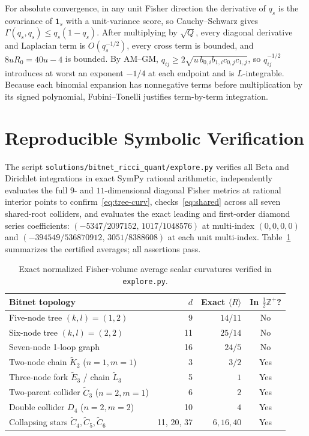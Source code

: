 \documentclass[11pt]{article}
\theoremstyle{plain}
\theoremstyle{definition}
\theoremstyle{remark}
\begin{document}
For absolute convergence, in any unit Fisher direction the derivative of $q_s$ is the covariance of $\mathbf{1}_s$ with a unit-variance score, so Cauchy--Schwarz gives $\Gamma(q_s, q_s) \le q_s(1 - q_s)$. After multiplying by $\sqrt{Q}$, every diagonal derivative and Laplacian term is $O(q_s^{-1/2})$, every cross term is bounded, and $8uR_0 = 40u - 4$ is bounded. By AM--GM, $q_{ij} \ge 2\sqrt{u\,b_{0,i} b_{1,i} c_{0,j} c_{1,j}}$, so $q_{ij}^{-1/2}$ introduces at worst an exponent $-1/4$ at each endpoint and is $L$-integrable. Because each binomial expansion has nonnegative terms before multiplication by its signed polynomial, Fubini--Tonelli justifies term-by-term integration.

\section{Reproducible Symbolic Verification}

The script \texttt{solutions/bitnet\_ricci\_quant/explore.py} verifies all Beta and Dirichlet integrations in exact SymPy rational arithmetic, independently evaluates the full $9$- and $11$-dimensional diagonal Fisher metrics at rational interior points to confirm~\eqref{eq:tree-curv}, checks~\eqref{eq:shared} across all seven shared-root colliders, and evaluates the exact leading and first-order diamond series coefficients: $(-5347/2097152,\, 1017/1048576)$ at multi-index $(0,0,0,0)$ and $(-394549/536870912,\, 3051/8388608)$ at each unit multi-index. Table~\ref{tab:bitnets} summarizes the certified averages; all assertions pass.

\begin{table}[htbp]
\centering
\begin{tabular}{@{}lrrc@{}}
\toprule
Bitnet topology & $d$ & Exact $\langle R \rangle$ & In $\tfrac{1}{2}\mathbb{Z}^+$? \\
\midrule
Five-node tree $(k, l) = (1, 2)$ & 9 & $14/11$ & No \\
Six-node tree $(k, l) = (2, 2)$ & 11 & $25/14$ & No \\
Seven-node 1-loop graph & 16 & $24/5$ & No \\
Two-node chain $\tilde{K}_2$ ($n=1, m=1$) & 3 & $3/2$ & Yes \\
Three-node fork $\tilde{E}_3$ / chain $\tilde{L}_3$ & 5 & $1$ & Yes \\
Two-parent collider $\tilde{C}_3$ ($n=2, m=1$) & 6 & $2$ & Yes \\
Double collider $D_4$ ($n=2, m=2$) & 10 & $4$ & Yes \\
Collapsing stars $\tilde{C}_4, \tilde{C}_5, \tilde{C}_6$ & 11, 20, 37 & $6, 16, 40$ & Yes \\
\bottomrule
\end{tabular}
\caption{Exact normalized Fisher-volume average scalar curvatures verified in \texttt{explore.py}.}\label{tab:bitnets}
\end{table}
\end{document}
